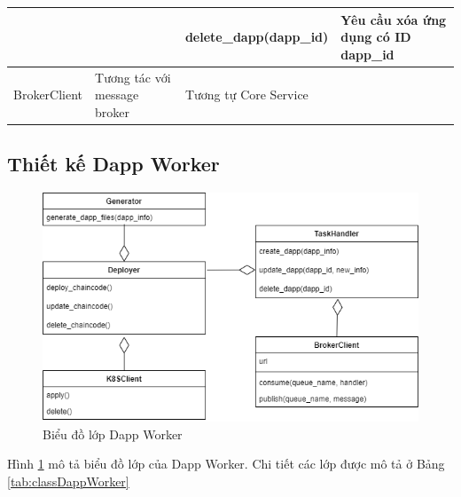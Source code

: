 \documentclass[../DoAn.tex]{subfiles}
\begin{document}
\begin{longtable}{|p{}|p{}|p{}|p{}|}
                                                             &                                                                      & delete\_dapp\hspace{0pt}(dapp\_id)                         & Yêu cầu xóa ứng dụng có ID dapp\_id                                        \\ \hline
    BrokerClient                                             & Tương tác với message broker                                         & \multicolumn{2}{p{0.6\textwidth}|}{Tương tự Core Service}                                                                              \\ \hline
\end{longtable}

\subsection{Thiết kế Dapp Worker}

\begin{figure}[H]
    \centering
    \includegraphics[width=0.75\linewidth]{Hinhve/DoAn-ClassDappWorker.drawio.png}
    \caption{Biểu đồ lớp Dapp Worker}
    \label{fig:classDappWorker}
\end{figure}

Hình \ref{fig:classDappWorker} mô tả biểu đồ lớp của Dapp Worker. Chi tiết các
lớp được mô tả ở Bảng \ref{tab:classDappWorker}
\end{document}
